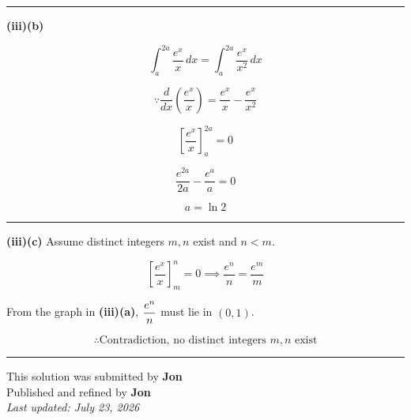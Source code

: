 \documentclass[12pt]{article}
\begin{document}
\bigskip\hrule\bigskip

\textbf{(iii)(b)}

$$\int_a^{2a}\frac{e^x}{x}\,dx=\int_a^{2a}\frac{e^x}{x^2}\,dx$$

$$\because \frac{d}{dx}\left(\frac{e^x}{x}\right)=\frac{e^x}{x}-\frac{e^x}{x^2}$$

$$\left[\frac{e^x}{x}\right]_a^{2a}=0$$

$$\frac{e^{2a}}{2a}-\frac{e^a}{a}=0$$

$$a=\ln2$$

\bigskip\hrule\bigskip

\textbf{(iii)(c)} Assume distinct integers $m,n$ exist and $n<m$.

$$\left[\frac{e^x}{x}\right]_m^n=0\implies\frac{e^n}{n}=\frac{e^m}{m}$$

From the graph in \textbf{(iii)(a)}, $\displaystyle \frac {e^n}{n}$ must lie in $(0,1)$.

$$\therefore \text{Contradiction, no distinct integers }m,n\text{ exist}$$
\bigskip
\hrule
\begin{center}
    This solution was submitted by \textbf{Jon}\\[4pt]
    Published and refined by \textbf{Jon}\\[8pt]
    \textit{Last updated: July 23, 2026}
\end{center}
\end{document}
